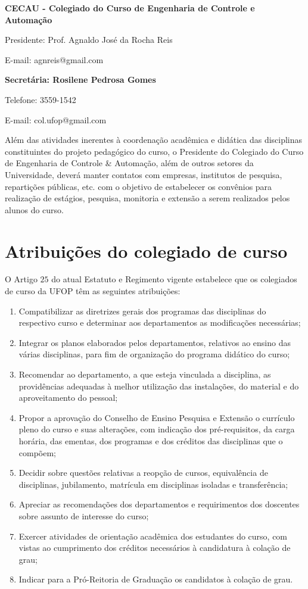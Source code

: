 \textbf{CECAU - Colegiado do Curso de Engenharia de Controle e Automação}

Presidente: Prof. Agnaldo José da Rocha Reis

E-mail: agnreis@gmail.com

\textbf{Secretária: Rosilene Pedrosa Gomes}

Telefone: 3559-1542

E-mail: col.ufop@gmail.com

Além das atividades inerentes à coordenação acadêmica e didática das disciplinas constituintes do projeto pedagógico do curso, o Presidente do Colegiado do Curso de Engenharia de Controle \& Automação, além de outros setores da Universidade, deverá manter contatos com empresas, institutos de pesquisa, repartições públicas, etc. com o objetivo de estabelecer os convênios para realização de estágios, pesquisa, monitoria e extensão a serem realizados pelos alunos do curso.

\section{Atribuições do colegiado de curso}
O Artigo $25$ do atual Estatuto e Regimento vigente estabelece que os colegiados de curso da UFOP têm as seguintes atribuições:
\begin{enumerate}
	\item Compatibilizar as diretrizes gerais dos programas das disciplinas do respectivo curso e determinar aos departamentos as modificações necessárias;
	
	\item Integrar os planos elaborados pelos departamentos, relativos ao ensino das várias disciplinas, para fim de organização do programa didático do curso;
	
	\item Recomendar ao departamento, a que esteja vinculada a disciplina, as providências adequadas à melhor utilização das instalações, do material e do aproveitamento do pessoal;
	
	\item Propor a aprovação do Conselho de Ensino Pesquisa e Extensão o currículo pleno do curso e suas alterações, com indicação dos pré-requisitos, da carga horária, das ementas, dos programas e dos créditos das disciplinas que o compõem;
	
	\item Decidir sobre questões relativas a reopção de cursos, equivalência de disciplinas, jubilamento, matrícula em disciplinas isoladas e transferência;
	
	\item Apreciar as recomendações dos departamentos e requirimentos dos doscentes sobre assunto de interesse do curso;
	
	\item Exercer atividades de orientação acadêmica dos estudantes do curso, com vistas ao cumprimento dos créditos necessários à candidatura à colação de grau;
	
	\item Indicar para a Pró-Reitoria de Graduação os candidatos à colação de grau.
\end{enumerate}

